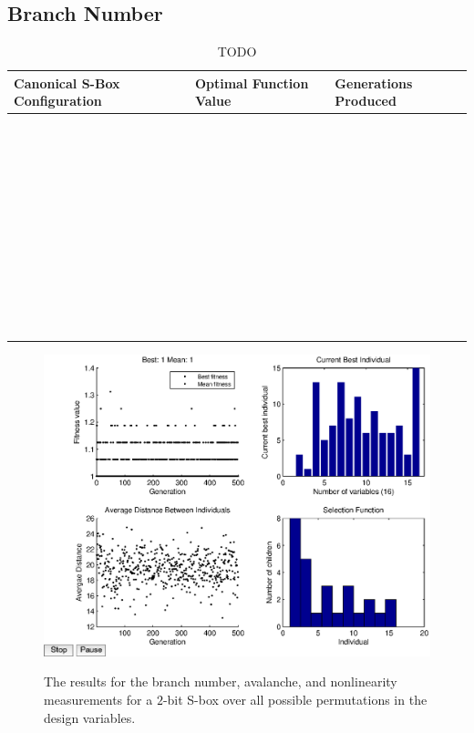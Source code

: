 \documentclass[11pt]{article}
\begin{document}
\subsection{Branch Number}

\begin{table}
	\centering
	\label{bnTable}
	\caption{TODO}
    \begin{tabular}{|l|l|l|}
        \hline
        Canonical S-Box Configuration & Optimal Function Value & Generations Produced \\ \hline
        ~ & ~ & ~ \\ 
        ~ & ~ & ~ \\ 
        ~ & ~ & ~ \\ 
        ~ & ~ & ~ \\ 
        ~ & ~ & ~ \\ 
        ~ & ~ & ~ \\ 
        ~ & ~ & ~ \\ 
        ~ & ~ & ~ \\ 
        ~ & ~ & ~ \\ 
        ~ & ~ & ~ \\
        \hline
    \end{tabular}
\end{table}

\begin{figure}
	\centering
	\includegraphics[scale=0.5]{images/bn_results16.eps} \\
	\label{bn16}
\caption{The results for the branch number, avalanche, and nonlinearity measurements for a $2$-bit S-box over all possible permutations in the design variables. }
\end{figure}
\end{document}
